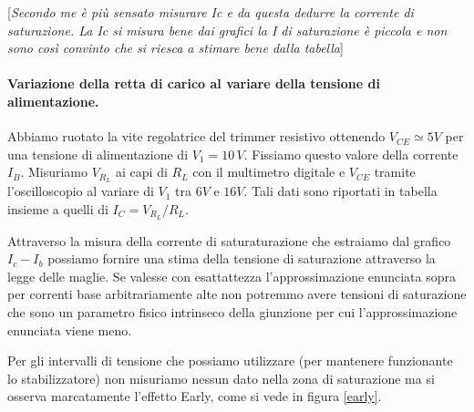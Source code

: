 \documentclass[10pt,a4paper]{article}
\newcommand{\rem}[1]{[\emph{#1}]}
\begin{document}

 
 \rem{Secondo me è più sensato misurare Ic e da questa dedurre la corrente di saturazione. La Ic si misura bene dai grafici la I di saturazione è piccola e non sono così convinto che si riesca a stimare bene dalla tabella}
 
\paragraph{Variazione della retta di carico al variare della tensione di alimentazione.}
 
Abbiamo ruotato la vite regolatrice del trimmer resistivo ottenendo $V_{CE}\simeq 5V$ per una tensione di alimentazione di $V_1 = 10 \, V$. Fissiamo questo valore della corrente $I_B$. Misuriamo  $V_{R_L}$ ai capi di $R_L$ con il multimetro digitale  e $V_{CE}$ tramite l'oscilloscopio al variare di $V_1$ tra $6 V$ e $16 V$. Tali dati sono riportati in tabella insieme a quelli di $I_C=V_{R_L}/R_L$.


Attraverso la misura della corrente di saturaturazione che estraiamo dal grafico $I_c - I_b$ possiamo fornire una stima della tensione di saturazione attraverso la legge delle maglie. Se valesse con esattattezza l'approssimazione enunciata sopra per correnti base arbitrariamente alte non potremmo avere tensioni di saturazione che sono un parametro fisico intrinseco della giunzione per cui l'approssimazione enunciata viene meno.

Per gli intervalli di tensione che possiamo utilizzare (per mantenere funzionante lo stabilizzatore) non misuriamo nessun dato nella zona di saturazione ma si osserva marcatamente l'effetto Early, come si vede in figura \ref{early}.
\end{document}
